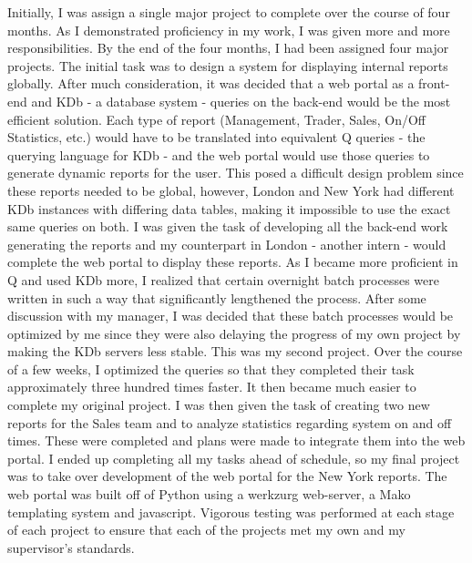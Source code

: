 Initially, I was assign a single major project to complete over the course of four months.  As I demonstrated proficiency in my work, I was given more and more responsibilities.  By the end of the four months, I had been assigned four major projects.  The initial task was to design a system for displaying internal reports globally. After much consideration, it was decided that a web portal as a front-end and KDb - a database system - queries on the back-end would be the most efficient solution.  Each type of report (Management, Trader, Sales, On/Off Statistics, etc.) would have to be translated into equivalent Q queries - the querying language for KDb - and the web portal would use those queries to generate dynamic reports for the user.  This posed a difficult design problem since these reports needed to be global, however, London and New York had different KDb instances with differing data tables, making it impossible to use the exact same queries on both.  I was given the task of developing all the back-end work generating the reports and my counterpart in London - another intern - would complete the web portal to display these reports.  As I became more proficient in Q and used KDb more, I realized that certain overnight batch processes were written in such a way that significantly lengthened the process.  After some discussion with my manager, I was decided that these batch processes would be optimized by me since they were also delaying the progress of my own project by making the KDb servers less stable.  This was my second project.  Over the course of a few weeks, I optimized the queries so that they completed their task approximately three hundred times faster.  It then became much easier to complete my original project.  I was then given the task of creating two new reports for the Sales team and to analyze statistics regarding system on and off times. These were completed and plans were made to integrate them into the web portal.  I ended up completing all my tasks ahead of schedule, so my final project was to take over development of the web portal for the New York reports.  The web portal was built off of Python using a werkzurg web-server, a Mako templating system and javascript.  Vigorous testing was performed at each stage of each project to ensure that each of the projects met my own and my supervisor's standards.\newline

